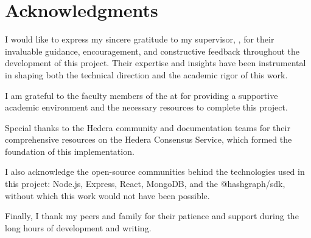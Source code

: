 \chapter*{Acknowledgments}
\thispagestyle{plain}

I would like to express my sincere gratitude to my supervisor, \supervisor, for their
invaluable guidance, encouragement, and constructive feedback throughout the
development of this project. Their expertise and insights have been instrumental
in shaping both the technical direction and the academic rigor of this work.

I am grateful to the faculty members of the \department at \institution for
providing a supportive academic environment and the necessary resources to
complete this project.

Special thanks to the Hedera community and documentation teams for their
comprehensive resources on the Hedera Consensus Service, which formed the
foundation of this implementation.

I also acknowledge the open-source communities behind the technologies used in
this project: Node.js, Express, React, MongoDB, and the @hashgraph/sdk, without
which this work would not have been possible.

Finally, I thank my peers and family for their patience and support during the
long hours of development and writing.

\cleardoublepage
\mbox{}
\thispagestyle{empty}
\cleardoublepage